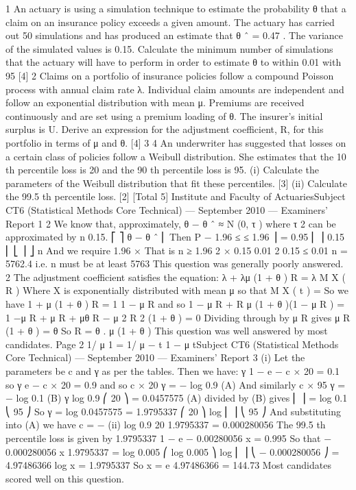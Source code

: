 1
An actuary is using a simulation technique to estimate the probability θ that a claim
on an insurance policy exceeds a given amount. The actuary has carried out 50
simulations and has produced an estimate that θ ˆ = 0.47 . The variance of the
simulated values is 0.15.
Calculate the minimum number of simulations that the actuary will have to perform in
order to estimate θ to within 0.01 with 95%
[4]
2
Claims on a portfolio of insurance policies follow a compound Poisson process with
annual claim rate λ. Individual claim amounts are independent and follow an
exponential distribution with mean μ. Premiums are received continuously and are
set using a premium loading of θ. The insurer’s initial surplus is U.
Derive an expression for the adjustment coefficient, R, for this portfolio in terms of μ
and θ.
[4]
3
4
An underwriter has suggested that losses on a certain class of policies follow a
Weibull distribution. She estimates that the 10 th percentile loss is 20 and the 90 th
percentile loss is 95.
(i) Calculate the parameters of the Weibull distribution that fit these percentiles.
[3]
(ii) Calculate the 99.5 th percentile loss.
[2]
[Total 5]
Institute and Faculty of ActuariesSubject CT6 (Statistical Methods Core Technical) — September 2010 — Examiners’ Report
1
2
We know that, approximately, θ − θ ˆ ≈ N (0, τ ) where τ 2 can be approximated by
n
0.15.
⎡
⎤
θ − θ ˆ
⎢
Then P − 1.96 ≤
≤ 1.96 ⎥ = 0.95
⎢
⎥
0.15
⎢ ⎣
⎥ ⎦
n
And we require 1.96 ×
That is n ≥
1.96 2 × 0.15
0.01 2
0.15
≤ 0.01
n
= 5762.4 i.e. n must be at least 5763
This question was generally poorly answered.
2
The adjustment coefficient satisfies the equation:
λ + λμ (1 + θ ) R = λ M X ( R )
Where X is exponentially distributed with mean μ so that M X ( t ) =
So we have 1 + μ (1 + θ ) R =
1
1 − μ R
and so 1 − μ R + R μ (1 + θ )(1 − μ R ) = 1
−μ R + μ R + μθ R − μ 2 R 2 (1 + θ ) = 0
Dividing through by μ R gives
μ R (1 + θ ) = θ
So R =
θ
.
μ (1 + θ )
This question was well answered by most candidates.
Page 2
1/ μ
1
=
1/ μ − t 1 − μ tSubject CT6 (Statistical Methods Core Technical) — September 2010 — Examiners’ Report
3
(i)
Let the parameters be c and γ as per the tables.
Then we have:
γ
1 − e − c × 20 = 0.1 so
γ
e − c × 20 = 0.9 and so c × 20 γ = − log 0.9 (A)
And similarly c × 95 γ = − log 0.1 (B)
γ
log 0.9
⎛ 20 ⎞
= 0.0457575
(A) divided by (B) gives ⎜ ⎟ =
log 0.1
⎝ 95 ⎠
So γ =
log 0.0457575
= 1.9795337
⎛ 20 ⎞
log ⎜ ⎟
⎝ 95 ⎠
And substituting into (A) we have c = −
(ii)
log 0.9
20 1.9795337
= 0.000280056
The 99.5 th percentile loss is given by
1.9795337
1 − e − 0.00280056 x
= 0.995
So that − 0.000280056 x 1.9795337 = log 0.005
⎛ log 0.005 ⎞
log ⎜
⎟
⎝ − 0.000280056 ⎠ = 4.97486366
log x =
1.9795337
So x = e 4.97486366 = 144.73
Most candidates scored well on this question.
